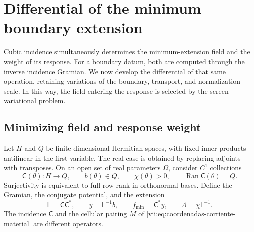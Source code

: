 
\section{Differential of the minimum boundary extension}
\label{vii:sec:corriente-extension-minima}

Cubic incidence simultaneously determines the minimum-extension field
and the weight of its response. For a boundary datum, both are computed
through the inverse incidence Gramian. We now develop the differential
of that same operation, retaining variations of the boundary,
transport, and normalization scale. In this way, the field entering the
response is selected by the screen variational problem.

\subsection{Minimizing field and response weight}
\label{vii:subsec:extension-minima-parametrizada}

Let \(H\) and \(Q\) be finite-dimensional Hermitian spaces, with
fixed inner products antilinear in the first variable. The real case
is obtained by replacing adjoints with transposes. On an open set of
real parameters \(\Omega\), consider \(C^1\) collections
\[
 \mathsf C(\theta):H\longrightarrow Q,\qquad
 b(\theta)\in Q,\qquad \chi(\theta)>0,
 \qquad \operatorname{Ran}\mathsf C(\theta)=Q.
\]
Surjectivity is equivalent to full row rank in orthonormal bases.
Define the Gramian, the conjugate potential, and the extension
\begin{equation}
 \mathsf L=\mathsf C\mathsf C^*,\qquad
 y=\mathsf L^{-1}b,\qquad f_{\min}=\mathsf C^*y,
 \qquad \Lambda=\chi\mathsf L^{-1}.
 \label{vii:eq:gramiano-extension-minima}
\end{equation}
The incidence \(\mathsf C\) and the cellular pairing \(M\) of
\eqref{vii:eq:coordenadas-corriente-material} are different operators.

